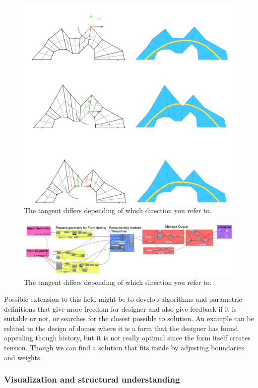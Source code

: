 \begin{figure}[H]
\centering
\includegraphics[width=0.6\linewidth ]{figure/Introduction/PreStudyDes.png}
\caption{The tangent differs depending of which direction you refer to. }
\end{figure}


\begin{figure}[H]
\centering
\includegraphics[width=0.9\linewidth ]{figure/Introduction/PreStudyDes3.png}
\caption{The tangent differs depending of which direction you refer to. }
\end{figure}

Possible extension to this field might be to develop algorithms and parametric definitions that give more freedom for designer and also give feedback if it is suitable or not, or searches for the closest possible to solution. An example can be related to the design of domes where it is a form that the designer has found appealing though history, but it is not really optimal since the form itself creates tension. Though we can find a solution that fits inside by adjusting boundaries and weights.

\subsubsection{Visualization and structural understanding }

